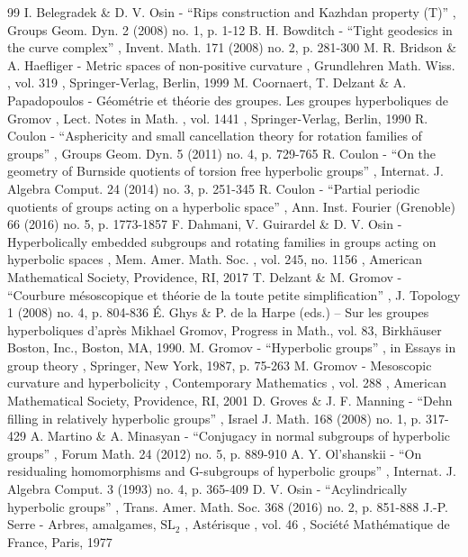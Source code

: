 \begin{thebibliography}{99}
 I. Belegradek \& D. V. Osin - “Rips construction and Kazhdan property (T)” , Groups Geom. Dyn. 2 (2008) no. 1, p. 1-12
 B. H. Bowditch - “Tight geodesics in the curve complex” , Invent. Math. 171 (2008) no. 2, p. 281-300
 M. R. Bridson \& A. Haefliger - Metric spaces of non-positive curvature , Grundlehren Math. Wiss. , vol. 319 , Springer-Verlag, Berlin, 1999
 M. Coornaert, T. Delzant \& A. Papadopoulos - Géométrie et théorie des groupes. Les groupes hyperboliques de Gromov , Lect. Notes in Math. , vol. 1441 , Springer-Verlag, Berlin, 1990
 R. Coulon - “Asphericity and small cancellation theory for rotation families of groups” , Groups Geom. Dyn. 5 (2011) no. 4, p. 729-765
 R. Coulon - “On the geometry of Burnside quotients of torsion free hyperbolic groups” , Internat. J. Algebra Comput. 24 (2014) no. 3, p. 251-345
 R. Coulon - “Partial periodic quotients of groups acting on a hyperbolic space” , Ann. Inst. Fourier (Grenoble) 66 (2016) no. 5, p. 1773-1857
 F. Dahmani, V. Guirardel \& D. V. Osin - Hyperbolically embedded subgroups and rotating families in groups acting on hyperbolic spaces , Mem. Amer. Math. Soc. , vol. 245, no. 1156 , American Mathematical Society, Providence, RI, 2017
 T. Delzant \& M. Gromov - “Courbure mésoscopique et théorie de la toute petite simplification” , J. Topology 1 (2008) no. 4, p. 804-836
 É. Ghys \& P. de la Harpe (eds.) -- Sur les groupes hyperboliques d’après Mikhael Gromov, Progress in Math., vol. 83, Birkhäuser Boston, Inc., Boston, MA, 1990.
 M. Gromov - “Hyperbolic groups” , in Essays in group theory , Springer, New York, 1987, p. 75-263
 M. Gromov - Mesoscopic curvature and hyperbolicity , Contemporary Mathematics , vol. 288 , American Mathematical Society, Providence, RI, 2001
 D. Groves \& J. F. Manning - “Dehn filling in relatively hyperbolic groups” , Israel J. Math. 168 (2008) no. 1, p. 317-429
 A. Martino \& A. Minasyan - “Conjugacy in normal subgroups of hyperbolic groups” , Forum Math. 24 (2012) no. 5, p. 889-910
 A. Y. Ol’shanskii - “On residualing homomorphisms and G-subgroups of hyperbolic groups” , Internat. J. Algebra Comput. 3 (1993) no. 4, p. 365-409
 D. V. Osin - “Acylindrically hyperbolic groups” , Trans. Amer. Math. Soc. 368 (2016) no. 2, p. 851-888
 J.-P. Serre - Arbres, amalgames, $\mathrm{SL}_2$ , Astérisque , vol. 46 , Société Mathématique de France, Paris, 1977
\end{thebibliography}
